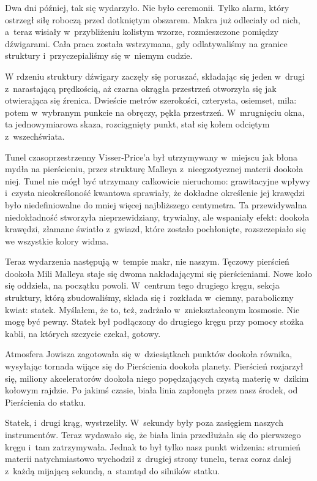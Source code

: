 \documentclass[oneside,polish,11pt,sfheadings]{mwbk}
\begin{document}
Dwa dni później, tak się wydarzyło. Nie było ceremonii. Tylko alarm,
który ostrzegł siłę roboczą przed dotkniętym obszarem. Makra już
odleciały od nich, a~teraz wisiały w~przybliżeniu kolistym wzorze,
rozmieszczone pomiędzy dźwigarami. Cała praca została wstrzymana, gdy
odlatywaliśmy na granice struktury i~przyczepialiśmy się w~niemym
cudzie.

W rdzeniu struktury dźwigary zaczęły się poruszać, składając się jeden w~drugi z~narastającą prędkością, aż czarna okrągła przestrzeń otworzyła
się jak otwierająca się źrenica. Dwieście metrów szerokości, czterysta,
osiemset, mila: potem w~wybranym punkcie na obręczy, pękła przestrzeń. W~mrugnięciu okna, ta jednowymiarowa skaza, rozciągnięty punkt, stał się
kołem odciętym z~wszechświata.

Tunel czasoprzestrzenny Visser-Price'a był utrzymywany w~miejscu jak
błona mydła na pierścieniu, przez strukturę Malleya z~nieegzotycznej
materii dookoła niej. Tunel nie mógł być utrzymany całkowicie
nieruchomo: grawitacyjne wpływy i~czysta nieokreśloność kwantowa
sprawiały, że dokładne określenie jej krawędzi było niedefiniowalne do
mniej więcej najbliższego centymetra. Ta przewidywalna niedokładność
stworzyła nieprzewidziany, trywialny, ale wspaniały efekt: dookoła
krawędzi, złamane światło z~gwiazd, które zostało pochłonięte,
rozszczepiało się we wszystkie kolory widma.

Teraz wydarzenia następują w~tempie makr, nie naszym. Tęczowy pierścień
dookoła Mili Malleya staje się dwoma nakładającymi się pierścieniami.
Nowe koło się oddziela, na początku powoli. W~centrum tego drugiego
kręgu, sekcja struktury, którą zbudowaliśmy, składa się i~rozkłada w~ciemny, paraboliczny kwiat: statek. Myślałem, że to, też, zadrżało w~zniekształconym kosmosie. Nie mogę być pewny. Statek był podłączony do
drugiego kręgu przy pomocy stożka kabli, na których szczycie czekał,
gotowy.

Atmosfera Jowisza zagotowała się w~dziesiątkach punktów dookoła równika,
wysyłając tornada wijące się do Pierścienia dookoła planety. Pierścień
rozjarzył się, miliony akceleratorów dookoła niego popędzających czystą
materię w~dzikim kołowym rajdzie. Po jakimś czasie, biała linia
zapłonęła przez nasz środek, od Pierścienia do statku.

Statek, i~drugi krąg, wystrzeliły. W~sekundy były poza zasięgiem naszych
instrumentów. Teraz wydawało się, że biała linia przedłużała się do
pierwszego kręgu i~tam zatrzymywała. Jednak to był tylko nasz punkt
widzenia: strumień materii natychmiastowo wychodził z~drugiej strony
tunelu, teraz coraz dalej z~każdą mijającą sekundą, a~stamtąd do
silników statku.
\end{document}
